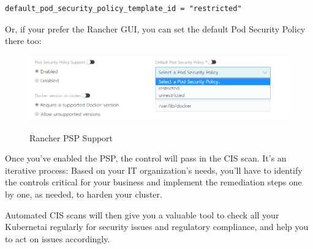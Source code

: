 \begin{lstlisting}[caption=Cluster Template with PSP, frame=single, basicstyle=\ttfamily]
default_pod_security_policy_template_id = "restricted"
\end{lstlisting}

Or, if your prefer the Rancher GUI, you can set the default Pod Security Policy there too:

\begin{figure}[H]
\centering
\caption {Rancher PSP Support}
\includegraphics[width=\linewidth]{images/rancher-psp-support.png}
\label{fig:rancherPSP}
\end{figure}

Once you've enabled the PSP, the control will pass in the CIS scan. It's an iterative process: Based on your IT organization's needs, you'll have to identify the controls critical for your business and implement the remediation steps one by one, as needed, to harden your cluster.

Automated CIS scans will then give you a valuable tool to check all your Kubernetai regularly for security issues and regulatory compliance, and help you to act on issues accordingly.
